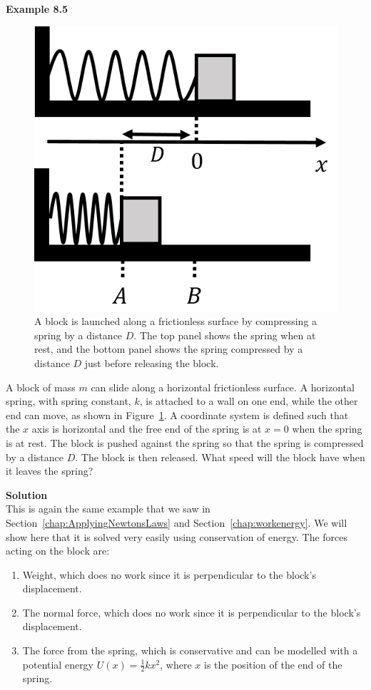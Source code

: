 \begin{framed}
\textbf{Example 8.5}\\
\begin{figure}[!htbp]
\centering
\includegraphics[width=0.4\linewidth]{files/blockspring-5094bde59d2625146e6655fc2e2cf358.png}
\caption[]{A block is launched along a frictionless surface by compressing a spring by a distance $D$. The top panel shows the spring when at rest, and the bottom panel shows the spring compressed by a distance $D$ just before releasing the block.}
\label{fig:potentialecons:blockspring}
\end{figure}

A block of mass $m$ can slide along a horizontal frictionless surface. A horizontal spring, with spring constant, $k$, is attached to a wall on one end, while the other end can move, as shown in Figure~\ref{fig:potentialecons:blockspring}. A coordinate system is defined such that the $x$ axis is horizontal and the free end of the spring is at $x=0$ when the spring is at rest. The block is pushed against the spring so that the spring is compressed by a distance $D$. The block is then released. What speed will the block have when it leaves the spring?

\begin{framed}
\textbf{Solution}\\
This is again the same example that we saw in Section~\ref{chap:ApplyingNewtonsLaws} and Section~\ref{chap:workenergy}. We will show here that it is solved very easily using conservation of energy. The forces acting on the block are:

\begin{enumerate}
\item Weight, which does no work since it is perpendicular to the block's displacement.
\item The normal force, which does no work since it is perpendicular to the block's displacement.
\item The force from the spring, which is conservative and can be modelled with a potential energy $U(x)=\frac{1}{2}kx^2$, where $x$ is the position of the end of the spring.
\end{enumerate}


\end{framed}
\end{framed}

